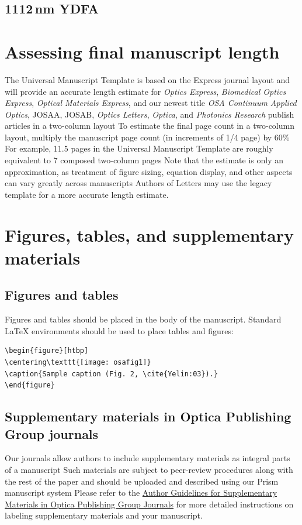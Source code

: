 \documentclass{osa-article}
\begin{document}
\subsection{1112\,nm YDFA}


\section{Assessing final manuscript length}
The Universal Manuscript Template is based on the Express journal layout and will provide an accurate length estimate for \emph{Optics Express}, \emph{Biomedical Optics Express},  \emph{Optical Materials Express}, and our newest title \emph{OSA Continuum}
\emph{Applied Optics}, JOSAA, JOSAB, \emph{Optics Letters}, \emph{Optica}, and \emph{Photonics Research} publish articles in a two-column layout
To estimate the final page count in a two-column layout, multiply the manuscript page count (in increments of 1/4 page) by 60\%
For example, 11.5 pages in the Universal Manuscript Template are roughly equivalent to 7 composed two-column pages
Note that the estimate is only an approximation, as treatment of figure sizing, equation display, and other aspects can vary greatly across manuscripts
Authors of Letters may use the legacy template for a more accurate length estimate.

\section{Figures, tables, and supplementary materials}

\subsection{Figures and tables}
Figures and tables should be placed in the body of the manuscript.
Standard \LaTeX{} environments should be used to place tables and figures:
\begin{verbatim}
\begin{figure}[htbp]
\centering\texttt{[image: osafig1]}
\caption{Sample caption (Fig. 2, \cite{Yelin:03}).}
\end{figure}
\end{verbatim}

\subsection{Supplementary materials in Optica Publishing Group journals}
Our journals allow authors to include supplementary materials as integral parts of a manuscript
Such materials are subject to peer-review procedures along with the rest of the paper and should be uploaded and described using our Prism manuscript system
Please refer to the \href{https://opg.optica.org/submit/style/supplementary_materials.cfm}{Author Guidelines for Supplementary Materials in Optica Publishing Group Journals} for more detailed instructions on labeling supplementary materials and your manuscript.
\end{document}
